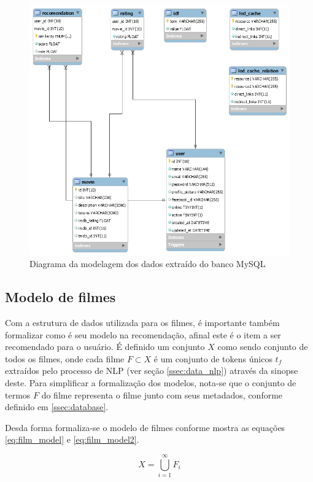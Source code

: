 \begin{figure}
	\centering
	\includegraphics[scale=0.5]{imagens/user_model.png}
	\caption{Diagrama da modelagem dos dados extraído do banco MySQL}
	\label{fig:user_model}
\end{figure}

\label{ssec:database}
\subsection{Modelo de filmes}

Com a estrutura de dados utilizada para os filmes, é importante também formalizar como é seu modelo na recomendação, afinal este é o item a ser recomendado para o usuário. É definido um conjunto $X$ como sendo conjunto de todos os filmes, onde cada filme $F \subset X$ é um conjunto de tokens únicos $t_f$ extraídos pelo processo de \ac{NLP} (ver seção \ref{ssec:data_nlp}) através da sinopse deste. Para simplificar a formalização dos modelos, nota-se que o conjunto de termos $F$ do filme representa o filme junto com seus metadados, conforme definido em \ref{ssec:database}.

Desda forma formaliza-se o modelo de filmes conforme mostra as equações \ref{eq:film_model} e \ref{eq:film_model2}.

\begin{equation}
	X = \bigcup\limits_{i=1}^{\infty} F_{i}
\label{eq:film_model}
\end{equation}

